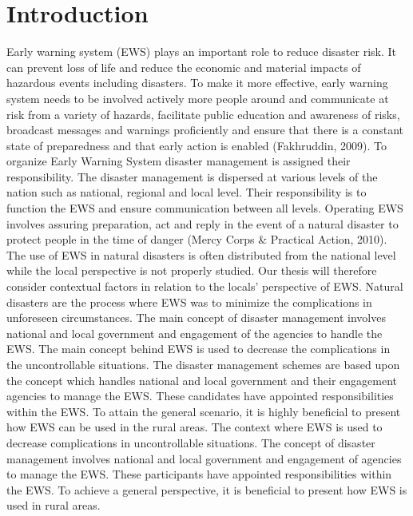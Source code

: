 
\chapter{Introduction}\label{chapter:introduction} %

Early warning system (EWS) plays an important role to reduce disaster risk. It can prevent loss of life and reduce the economic and material impacts of hazardous events including disasters. To make it more effective, early warning system needs to be involved actively more people around and communicate at risk from a variety of hazards, facilitate public education and awareness of risks, broadcast messages and warnings proficiently and ensure that there is a constant state of preparedness and that early action is enabled (Fakhruddin, 2009). To organize Early Warning System disaster management is assigned their responsibility. The disaster management is dispersed at various levels of the nation such as national, regional and local level. Their responsibility is to function the EWS and ensure communication between all levels. Operating EWS involves assuring preparation, act and reply in the event of a natural disaster to protect people in the time of danger (Mercy Corps & Practical Action, 2010). The use of EWS in natural disasters is often distributed from the national level while the local perspective is not properly studied. Our thesis will therefore consider contextual factors in relation to the locals’ perspective of EWS. 
Natural disasters are the process where EWS was to minimize the complications in unforeseen circumstances. The main concept of disaster management involves national and local government and engagement of the agencies to handle the EWS.  The main concept behind EWS is used to decrease the complications in the uncontrollable situations. The disaster management schemes are based upon the concept which  handles national and local government  and their engagement agencies  to manage the EWS. These candidates have appointed responsibilities within the EWS. To attain the general scenario, it is highly beneficial to present how EWS can be used in the rural areas.
 The context where EWS is used to decrease complications in uncontrollable situations. The concept of disaster management involves national and local government and engagement of agencies to manage the EWS. These participants have appointed responsibilities within the EWS. To achieve a general perspective, it is beneficial to present how EWS is used in rural areas.


